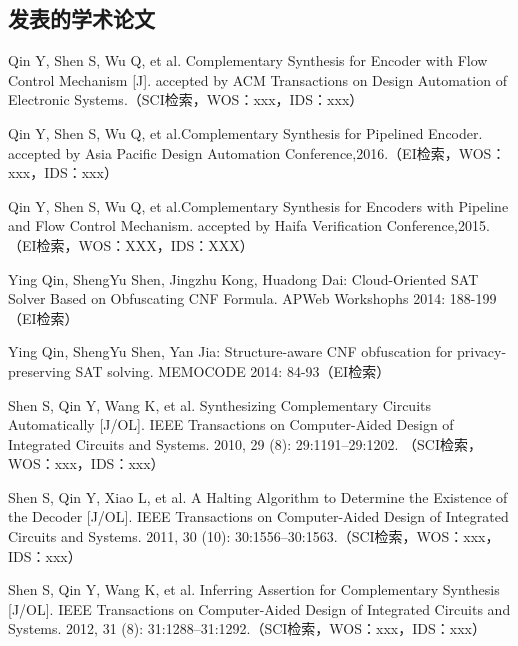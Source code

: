 \begin{resume}

  \section*{发表的学术论文} %

  \begin{enumerate}[{[}1{]}]
  \addtolength{\itemsep}{-.36\baselineskip}%
  \item Qin Y, Shen S, Wu Q, et al. Complementary Synthesis for Encoder with Flow
Control Mechanism [J]. accepted by ACM Transactions on Design Automation of
Electronic Systems.（SCI检索，WOS：xxx，IDS：xxx）

  \item Qin Y, Shen S, Wu Q, et al.Complementary Synthesis for Pipelined Encoder.
accepted by Asia Pacific Design Automation Conference,2016.（EI检索，WOS：xxx，IDS：xxx）

  \item Qin Y, Shen S, Wu Q, et al.Complementary Synthesis for Encoders with
Pipeline and Flow Control Mechanism.
accepted by Haifa Verification Conference,2015.（EI检索，WOS：XXX，IDS：XXX）

  \item Ying Qin, ShengYu Shen, Jingzhu Kong, Huadong Dai:
Cloud-Oriented SAT Solver Based on Obfuscating CNF Formula. APWeb Workshophs 2014: 188-199（EI检索）

  \item Ying Qin, ShengYu Shen, Yan Jia:
Structure-aware CNF obfuscation for privacy-preserving SAT solving. MEMOCODE 2014: 84-93（EI检索）

  \item Shen S, Qin Y, Wang K, et al. Synthesizing Complementary Circuits Automatically
[J/OL]. IEEE Transactions on Computer-Aided Design of Integrated Circuits
and Systems. 2010, 29 (8): 29:1191–29:1202. （SCI检索，WOS：xxx，IDS：xxx）

  \item Shen S, Qin Y, Xiao L, et al. A Halting Algorithm to Determine the Existence of
the Decoder [J/OL]. IEEE Transactions on Computer-Aided Design of Integrated
Circuits and Systems. 2011, 30 (10): 30:1556–30:1563.（SCI检索，WOS：xxx，IDS：xxx）

  \item Shen S, Qin Y, Wang K, et al. Inferring Assertion for Complementary Synthesis
[J/OL]. IEEE Transactions on Computer-Aided Design of Integrated Circuits
and Systems. 2012, 31 (8): 31:1288–31:1292.（SCI检索，WOS：xxx，IDS：xxx）



\end{enumerate}
\end{resume}
